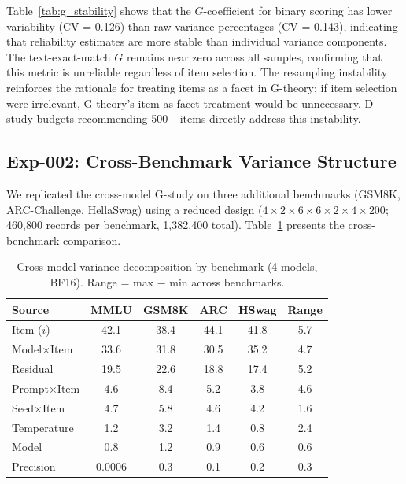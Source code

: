 \documentclass[letterpaper]{article}
\begin{document}
Table~\ref{tab:g_stability} shows that the $G$-coefficient for binary scoring has lower variability (CV = 0.126) than raw variance percentages (CV = 0.143), indicating that reliability estimates are more stable than individual variance components.
The text-exact-match $G$ remains near zero across all samples, confirming that this metric is unreliable regardless of item selection.
The resampling instability reinforces the rationale for treating items as a facet in G-theory: if item selection were irrelevant, G-theory's item-as-facet treatment would be unnecessary.
D-study budgets recommending 500+ items directly address this instability.

\subsection{Exp-002: Cross-Benchmark Variance Structure}
\label{sec:exp002}

We replicated the cross-model G-study on three additional benchmarks (GSM8K, ARC-Challenge, HellaSwag) using a reduced design ($4 \times 2 \times 6 \times 6 \times 2 \times 4 \times 200$; 460,800 records per benchmark, 1,382,400 total).
Table~\ref{tab:cross_bench} presents the cross-benchmark comparison.

\begin{table}[t]
\centering
\caption{Cross-model variance decomposition by benchmark (4 models, BF16). Range = max $-$ min across benchmarks.}
\label{tab:cross_bench}
\begin{tabular}{lccccc}
\toprule
Source & MMLU & GSM8K & ARC & HSwag & Range \\
\midrule
Item ($i$)              & 42.1 & 38.4 & 44.1 & 41.8 & 5.7 \\
Model$\times$Item       & 33.6 & 31.8 & 30.5 & 35.2 & 4.7 \\
Residual                & 19.5 & 22.6 & 18.8 & 17.4 & 5.2 \\
Prompt$\times$Item      & 4.6  & 8.4  & 5.2  & 3.8  & 4.6 \\
Seed$\times$Item        & 4.7  & 5.8  & 4.6  & 4.2  & 1.6 \\
Temperature             & 1.2  & 3.2  & 1.4  & 0.8  & 2.4 \\
Model                   & 0.8  & 1.2  & 0.9  & 0.6  & 0.6 \\
Precision               & 0.0006 & 0.3 & 0.1 & 0.2 & 0.3 \\
\bottomrule
\end{tabular}
\end{table}
\end{document}
